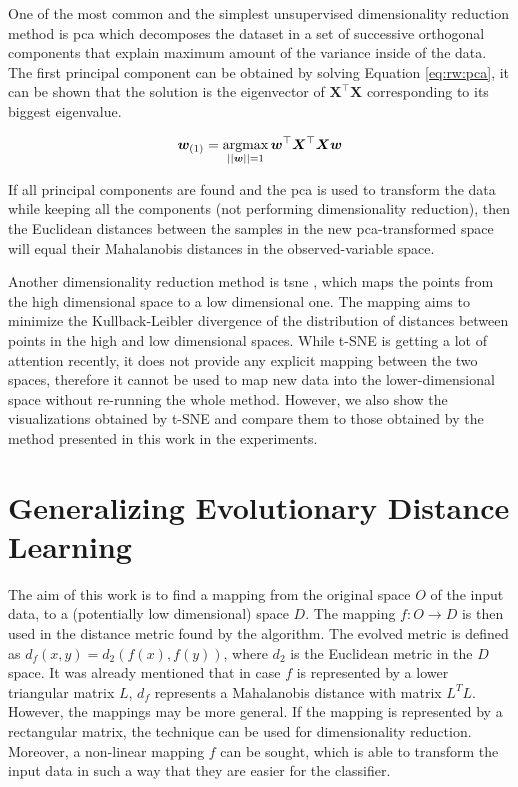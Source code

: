\documentclass[12pt,a4paper]{report}
\begin{document}
One of the most common and the simplest unsupervised dimensionality reduction method is \ac{pca} \citep{jolliffe2002principal} which decomposes the dataset in a set of successive orthogonal components that explain maximum amount of the variance inside of the data. The first principal component can be obtained by solving Equation \ref{eq:rw:pca}, it can be shown that the solution is the eigenvector of $\bm{X}^\top\bm{X}$ corresponding to its biggest eigenvalue.

\begin{equation} 
\bm{w}_{(1)} = \operatorname*{argmax}_{||\bm{w}||=1} \bm{w}^\top\bm{X}^\top\bm{X}\bm{w} \label{eq:rw:pca}
\end{equation}

If all principal components are found and the \ac{pca} is used to transform the data while keeping all the components (not performing dimensionality reduction), then the Euclidean distances between the samples in the new \ac{pca}-transformed space will equal their Mahalanobis distances in the observed-variable space.

Another dimensionality reduction method is \ac{tsne} \citep{maaten2008visualizing}, which maps the points from the high dimensional space to a low dimensional one. The mapping aims to minimize the Kullback-Leibler divergence of the distribution of distances between points in the high and low dimensional spaces. While t-SNE is getting a lot of attention recently, it does not provide any explicit mapping between the two spaces, therefore it cannot be used to map new data into the lower-dimensional space without re-running the whole method. However, we also show the visualizations obtained by t-SNE and compare them to those obtained by the method presented in this work in the experiments.


\chapter{Generalizing Evolutionary Distance Learning} \label{chap:our-method}

The aim of this work is to find a mapping from the original space $O$ of the input data, to a (potentially low dimensional) space $D$. The mapping $f: O \to D$ is then used in the distance metric found by the algorithm. The evolved metric is defined as $d_f(x, y) = d_2(f(x), f(y))$, where $d_2$ is the Euclidean metric in the $D$ space. It was already mentioned that in case $f$ is represented by a lower triangular matrix $L$, $d_f$ represents a Mahalanobis distance with matrix $L^TL$. However, the mappings may be more general. If the mapping is represented by a rectangular matrix, the technique can be used for dimensionality reduction. Moreover, a non-linear mapping $f$ can be sought, which is able to transform the input data in such a way that they are easier for the classifier.
\end{document}
